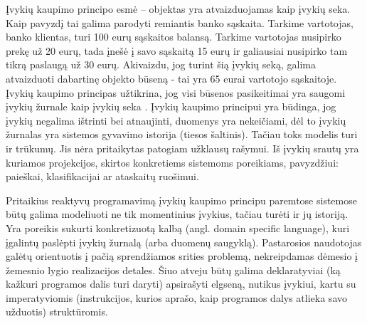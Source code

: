Įvykių kaupimo principo esmė – objektas yra atvaizduojamas kaip įvykių seka. Kaip pavyzdį tai galima parodyti remiantis banko sąskaita. Tarkime vartotojas, banko klientas, turi 100 eurų sąskaitos balansą. Tarkime vartotojas nusipirko prekę už 20 eurų, tada įnešė į savo sąskaitą 15 eurų ir galiausiai nusipirko tam tikrą paslaugą už 30 eurų. Akivaizdu, jog turint šią įvykių seką, galima atvaizduoti dabartinę objekto būseną - tai yra 65 eurai vartotojo sąskaitoje. Įvykių kaupimo principas užtikrina, jog visi būsenos pasikeitimai yra saugomi įvykių žurnale kaip įvykių seka \cite{vernon2013implementing}. Įvykių kaupimo principui yra būdinga, jog įvykių negalima ištrinti bei atnaujinti, duomenys yra nekeičiami, dėl to įvykių žurnalas yra sistemos gyvavimo istorija (tiesos šaltinis). Tačiau toks modelis turi ir trūkumų. Jis nėra pritaikytas patogiam užklausų rašymui. Iš įvykių srautų yra kuriamos projekcijos, skirtos konkretiems sistemoms poreikiams, pavyzdžiui: paieškai, klasifikacijai ar ataskaitų ruošimui.

Pritaikius reaktyvų programavimą įvykių kaupimo principu paremtose sistemose būtų galima modeliuoti ne tik momentinius įvykius, tačiau turėti ir jų istoriją. Yra poreikis sukurti konkretizuotą kalbą (angl. domain specific language), kuri įgalintų paslėpti įvykių žurnalą (arba duomenų saugyklą). Pastarosios naudotojas galėtų orientuotis į pačią sprendžiamos srities problemą, nekreipdamas dėmesio į žemesnio lygio realizacijos detales. Šiuo atveju būtų galima deklaratyviai (ką kažkuri programos dalis turi daryti) apsirašyti elgseną, nutikus įvykiui, kartu su imperatyviomis (instrukcijos, kurios aprašo, kaip programos dalys atlieka savo užduotis) struktūromis.




